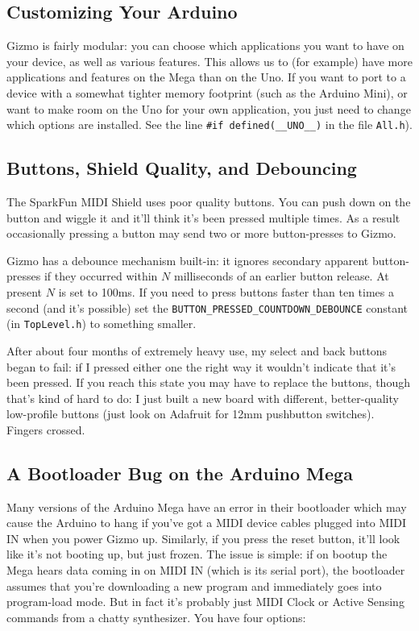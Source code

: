 \documentclass{article}
\begin{document}
\subsection{Customizing Your Arduino}

Gizmo is fairly modular: you can choose which applications you want to have on your device, as well as various features.  This allows us to (for example) have more applications and features on the Mega than on the Uno.  If you want to port to a device with a somewhat tighter memory footprint (such as the Arduino Mini), or want to make room on the Uno for your own application, you just need to change which options are installed.  See the line {\tt \#if defined(\_\_UNO\_\_)} in the file \texttt{All.h}).

\subsection{Buttons, Shield Quality, and Debouncing}
\label{debouncing}

The SparkFun MIDI Shield uses poor quality buttons.  You can push down on the button and wiggle it and it'll think it's been pressed multiple times.  As a result occasionally pressing a button may send two or more button-presses to Gizmo.

Gizmo has a debounce mechanism built-in: it ignores secondary apparent button-presses if they occurred within \(N\) milliseconds of an earlier button release.  At present \(N\) is set to 100ms.  If you need to press buttons faster than ten times a second (and it's possible) set the \texttt{BUTTON\_PRESSED\_COUNTDOWN\_DEBOUNCE} constant (in \texttt{TopLevel.h}) to something smaller.

After about four months of extremely heavy use, my select and back buttons began to fail: if I pressed either one the right way it wouldn't indicate that it's been pressed.  If you reach this state you may have to replace the buttons, though that's kind of hard to do: I just built a new board with different, better-quality low-profile buttons (just look on Adafruit for 12mm pushbutton switches).  Fingers crossed.

\subsection{A Bootloader Bug on the Arduino Mega}

Many versions of the Arduino Mega have an error in their bootloader which may cause the Arduino to hang if you've got a MIDI device cables plugged into MIDI IN when you power Gizmo up.  Similarly, if you press the reset button, it'll look like it's not booting up, but just frozen.  The issue is simple: if on bootup the Mega hears data coming in on MIDI IN (which is its serial port), the bootloader assumes that you're downloading a new program and immediately goes into program-load mode.    But in fact it's probably just MIDI Clock or Active Sensing commands from a chatty synthesizer.  You have four options:
\end{document}
